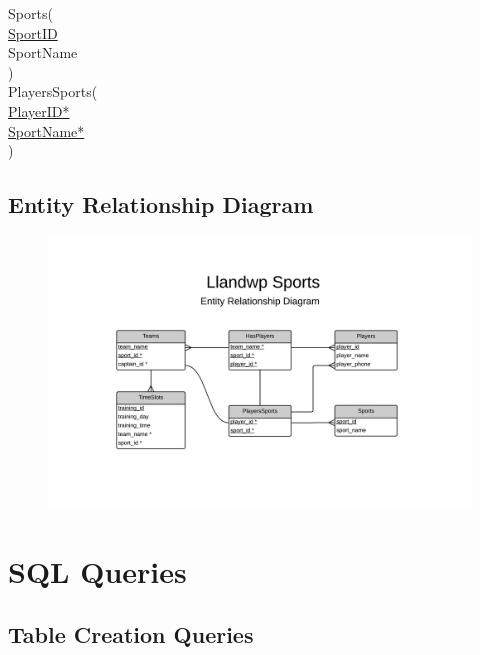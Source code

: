 \documentclass[11pt, article]{article}
\begin{document}
\begin{tabbing}
Sports( \\
	\hspace{5mm} \underline{SportID} \\
	\hspace{5mm} SportName \\
)\\

PlayersSports(\\
	\hspace{5mm}  \underline{PlayerID*}\\
	\hspace{5mm} \underline{SportName*} \\
 )\\

\end{tabbing}
\newpage
\subsection{Entity Relationship Diagram}

\begin{figure}[ht!]
\includegraphics[width=180mm,left]{ERD.jpeg}
\end{figure}

	\section{SQL Queries}
	
	\subsection{Table Creation Queries}
	
\end{document}
